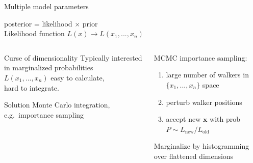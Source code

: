 \documentclass{beamer}
\begin{document}
\begin{frame}{Multiple model parameters}
  \begin{center}
    {\large posterior = likelihood $\times$ prior}\\[2ex]
    Likelihood function $L(x) \rightarrow L(x_1, ...,x_n)$
  \end{center}
  \begin{columns}[t]
    \begin{column}{0.5\textwidth}
      \begin{block}{Curse of dimensionality}
        Typically interested in marginalized probabilities\\[1ex]
        $L(x_1,...,x_n)$ easy to calculate,\\
        hard to integrate.
      \end{block}

      \begin{block}{Solution}
        Monte Carlo integration,
        e.g.\ importance sampling
      \end{block}
    \end{column}
    \vline
    \begin{column}{0.5\textwidth}
      \begin{center}
        {\color{theme} MCMC importance sampling:}\\[1ex]
        \begin{enumerate}
          \item large number of walkers in $\{x_1,...,x_n\}$ space
          \item perturb walker positions
          \item accept new $\mathbf x$ with prob\\
            $P \sim L_\text{new} / L_\text{old}$
        \end{enumerate}
        Marginalize by histogramming over flattened dimensions
      \end{center}
    \end{column}
  \end{columns}
\end{frame}
\end{document}
